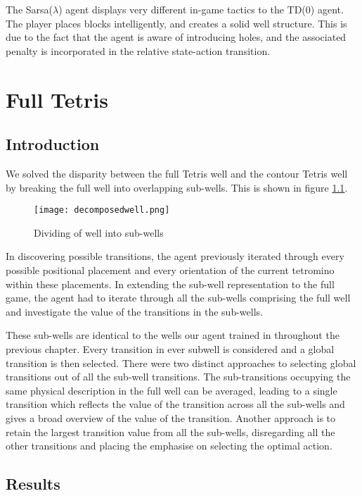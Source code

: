 \documentclass{rucsthesis}
\begin{document}
The Sarsa($\lambda$) agent displays very different in-game tactics to the TD(0) agent. The player places blocks intelligently, and creates a solid well structure. This is due to the fact that the agent is aware of introducing holes, and the associated penalty is incorporated in the relative state-action transition. 

\chapter{Full Tetris}

\section{Introduction}

We solved the disparity between the full Tetris well and the contour Tetris well by breaking the full well into overlapping sub-wells. This is shown in figure \ref{fig:subwells}.

\begin{figure}[h]
\centering
\texttt{[image: decomposedwell.png]}
\caption{Dividing of well into sub-wells}
\label{fig:subwells}
\end{figure}

In discovering possible transitions, the agent previously iterated through every possible positional placement and every orientation of the current tetromino within these placements. In extending the sub-well representation to the full game, the agent had to iterate through all the sub-wells comprising the full well and investigate the value of the transitions in the sub-wells.

These sub-wells are identical to the wells our agent trained in throughout the previous chapter. Every transition in ever subwell is considered and a global transition is then selected. There were two distinct approaches to selecting global transitions out of all the sub-well transitions. The sub-transitions occupying the same physical description in the full well can be averaged, leading to a single transition which reflects the value of the transition across all the sub-wells and gives a broad overview of the value of the transition. Another approach is to retain the largest transition value from all the sub-wells, disregarding all the other transitions and placing the emphasise on selecting the optimal action.


\section{Results}
\end{document}
